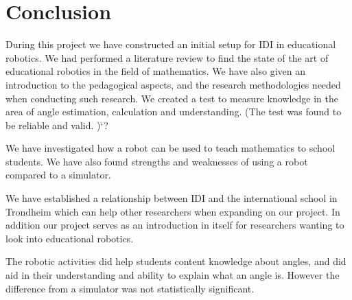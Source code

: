 \section{Conclusion}
During this project we have constructed an initial setup for IDI in educational robotics. 
We had performed a literature review to find the state of the art of educational robotics in the field of mathematics. 
We have also given an introduction to the pedagogical aspects, and the research methodologies needed when conducting such research.
We created a test to measure knowledge in the area of angle estimation, calculation and understanding. (The test was found to be reliable and valid. )`?

We have investigated how a robot can be used to teach mathematics to school students. We have also found strengths and weaknesses of using a robot compared to a simulator. 

We have established a relationship between IDI and the international school in Trondheim which can help other researchers when expanding on our project. In addition our project serves as an introduction in itself for researchers wanting to look into educational robotics. 

The robotic activities did help students content knowledge about angles, and did aid in their understanding and ability to explain what an angle is. However the difference from a simulator was not statistically significant.